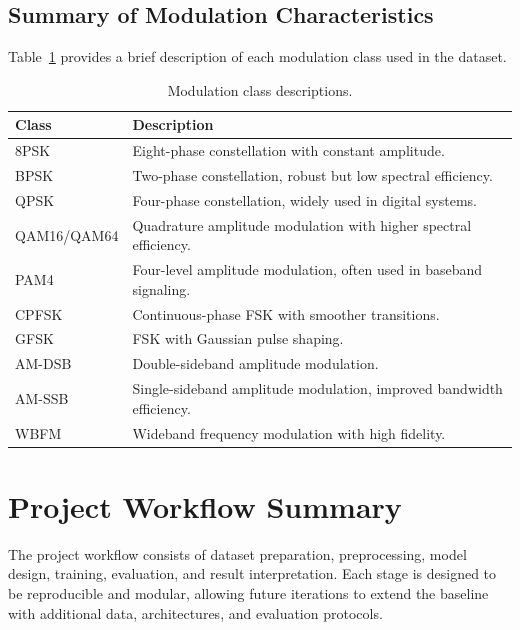 \documentclass[12pt,a4paper]{report}
\begin{document}
\section{Summary of Modulation Characteristics}
Table~\ref{tab:class-desc} provides a brief description of each modulation class used in the dataset.

\begin{table}[H]
    \centering
    \caption{Modulation class descriptions.}
    \label{tab:class-desc}
    \begin{tabular}{p{} p{}}
        \toprule
        \textbf{Class} & \textbf{Description} \\
        \midrule
        8PSK & Eight-phase constellation with constant amplitude. \\
        BPSK & Two-phase constellation, robust but low spectral efficiency. \\
        QPSK & Four-phase constellation, widely used in digital systems. \\
        QAM16/QAM64 & Quadrature amplitude modulation with higher spectral efficiency. \\
        PAM4 & Four-level amplitude modulation, often used in baseband signaling. \\
        CPFSK & Continuous-phase FSK with smoother transitions. \\
        GFSK & FSK with Gaussian pulse shaping. \\
        AM-DSB & Double-sideband amplitude modulation. \\
        AM-SSB & Single-sideband amplitude modulation, improved bandwidth efficiency. \\
        WBFM & Wideband frequency modulation with high fidelity. \\
        \bottomrule
    \end{tabular}
\end{table}

\chapter{Project Workflow Summary}
The project workflow consists of dataset preparation, preprocessing, model design, training, evaluation, and result interpretation. Each stage is designed to be reproducible and modular, allowing future iterations to extend the baseline with additional data, architectures, and evaluation protocols.
\end{document}

